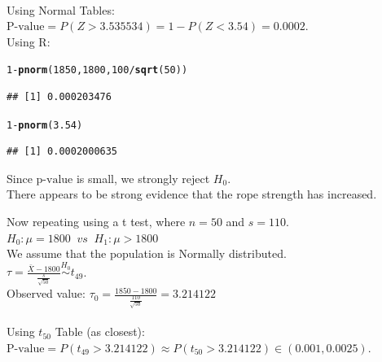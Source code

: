 \documentclass[bigtut]{tutorial}\usepackage[]{graphicx}\usepackage[]{color}
\makeatletter
\newcommand{\hlnum}[1]{\textcolor[rgb]{0.686,0.059,0.569}{#1}}%
\newcommand{\hlopt}[1]{\textcolor[rgb]{0,0,0}{#1}}%
\newcommand{\hlstd}[1]{\textcolor[rgb]{0.345,0.345,0.345}{#1}}%
\newcommand{\hlkwd}[1]{\textcolor[rgb]{0.737,0.353,0.396}{\textbf{#1}}}%
\newenvironment{kframe}{%
 \def\at@end@of@kframe{}%
 \ifinner\ifhmode%
  \def\at@end@of@kframe{\end{minipage}}%
  \begin{minipage}{\columnwidth}%
 \fi\fi%
 \def\FrameCommand##1{\hskip\@totalleftmargin \hskip-\fboxsep
 \colorbox{shadecolor}{##1}\hskip-\fboxsep
     \hskip-\linewidth \hskip-\@totalleftmargin \hskip\columnwidth}%
 \MakeFramed {\advance\hsize-\width
   \@totalleftmargin\z@ \linewidth\hsize
   \@setminipage}}%
 {\par\unskip\endMakeFramed%
 \at@end@of@kframe}
\newenvironment{knitrout}{}{} %
\makeatother
\begin{document}
\begin{tutorial}
\begin{questions}
\begin{solution}
 \\

Using Normal Tables: \\
$\text{P-value} = P( Z > 3.535534) = 1-P(Z < 3.54) = 0.0002$. \\

Using R:
\begin{knitrout}
\color{fgcolor}\begin{kframe}
\begin{alltt}
\hlnum{1}\hlopt{-}\hlkwd{pnorm}\hlstd{(}\hlnum{1850}\hlstd{,}\hlnum{1800}\hlstd{,}\hlnum{100}\hlopt{/}\hlkwd{sqrt}\hlstd{(}\hlnum{50}\hlstd{))}
\end{alltt}
\begin{verbatim}
## [1] 0.000203476
\end{verbatim}
\begin{alltt}
\hlnum{1}\hlopt{-}\hlkwd{pnorm}\hlstd{(}\hlnum{3.54}\hlstd{)}
\end{alltt}
\begin{verbatim}
## [1] 0.0002000635
\end{verbatim}
\end{kframe}
\end{knitrout}

\vspace{.5cm}
Since $\text{p-value}$ is small, we strongly reject $H_{0}$. \\
There appears to be strong evidence that the rope strength has increased.

\vspace{1cm}
Now repeating using a t test, where $n=50$ and $s=110$.\\

$H_0: \mu=1800  \;\; vs \;\; H_1: \mu>1800$ \\

We assume that the population is Normally distributed. \\

$\tau = \frac{ \bar{X} - 1800}{\frac{s}{\sqrt{50}} } \overset{H_0}{\sim} t_{49}$. \\
Observed value: $\tau_{0} = \frac{1850-1800}{\frac{110}{\sqrt{50}} } = 3.214122 $ \\


 \\

Using $t_{50}$ Table (as closest): \\
$\text{P-value} = P( t_{49} > 3.214122) \approx P( t_{50} > 3.214122) \in (0.001,0.0025)$. \\


\end{solution}
\end{questions}
\end{tutorial}
\end{document}
